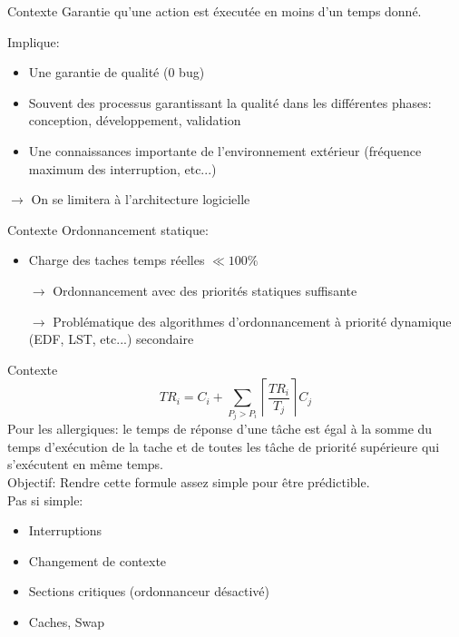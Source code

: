 \begin{frame}{Contexte}
  Garantie qu'une action est éxecutée en moins d'un temps donné.

  Implique:
  \begin{itemize}
    \item Une garantie de qualité (0 bug)
    \item Souvent des processus garantissant la qualité dans les différentes phases: conception, développement, validation
    \item Une connaissances importante de l'environnement extérieur (fréquence maximum des interruption, etc...)
  \end{itemize}
  $\to$ On se limitera à l'architecture logicielle
\end{frame}

\begin{frame}{Contexte}
  Ordonnancement statique:
  \begin{itemize}
    \item Charge des taches temps réelles $\ll 100\%$
    \item[$\to$] Ordonnancement avec des priorités statiques suffisante
    \item[$\to$] Problématique des algorithmes d'ordonnancement à priorité dynamique (EDF, LST, etc...) secondaire
  \end{itemize}
\end{frame}

\begin{frame}{Contexte}
  $$TR_i = C_i + \sum_{P_j > P_i} \left\lceil\frac{TR_i}{T_j}\right\rceil C_j$$
Pour les allergiques: le temps de réponse d'une tâche est égal à la somme du
temps d'exécution de la tache et de toutes les tâche de priorité supérieure
qui s'exécutent en même temps.\\[1.5ex]
Objectif: Rendre cette formule assez simple pour être prédictible.\\[1.5ex]
Pas si simple:
  \begin{itemize}
    \item Interruptions
    \item Changement de contexte
    \item Sections critiques (ordonnanceur désactivé)
    \item Caches, Swap
  \end{itemize}
\end{frame}

